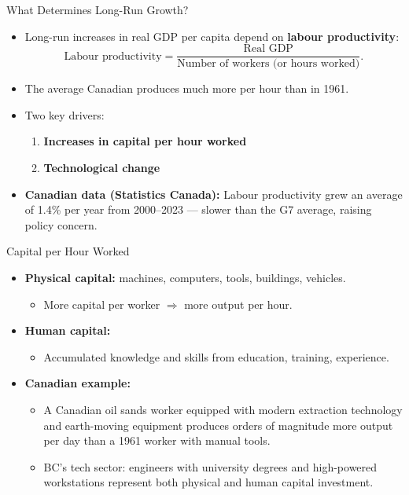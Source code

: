 \documentclass[aspectratio=169]{beamer}
\begin{document}

\begin{frame}{What Determines Long-Run Growth?}
\transfade
\begin{itemize}
  \item Long-run increases in real GDP per capita depend on \textbf{labour productivity}:
  \[
    \text{Labour productivity} = \frac{\text{Real GDP}}{\text{Number of workers (or hours worked)}}.
  \]
  \item The average Canadian produces much more per hour than in 1961.
  \item Two key drivers:
  \begin{enumerate}
    \item \textbf{Increases in capital per hour worked}
    \item \textbf{Technological change}
  \end{enumerate}
  \item \textbf{Canadian data (Statistics Canada):} Labour productivity grew an average of \alert{1.4\%} per year from 2000--2023 --- slower than the G7 average, raising policy concern.
\end{itemize}
\end{frame}

\begin{frame}{Capital per Hour Worked}
\transfade
\begin{itemize}
  \item \textbf{Physical capital:} machines, computers, tools, buildings, vehicles.
  \begin{itemize}
    \item More capital per worker $\Rightarrow$ more output per hour.
  \end{itemize}
  \item \textbf{Human capital:}
  \begin{itemize}
    \item Accumulated knowledge and skills from education, training, experience.
  \end{itemize}
  \item \textbf{Canadian example:}
  \begin{itemize}
    \item A Canadian oil sands worker equipped with modern extraction technology and earth-moving equipment produces orders of magnitude more output per day than a 1961 worker with manual tools.
    \item BC's tech sector: engineers with university degrees and high-powered workstations represent both physical and human capital investment.
  \end{itemize}
\end{itemize}
\end{frame}
\end{document}
